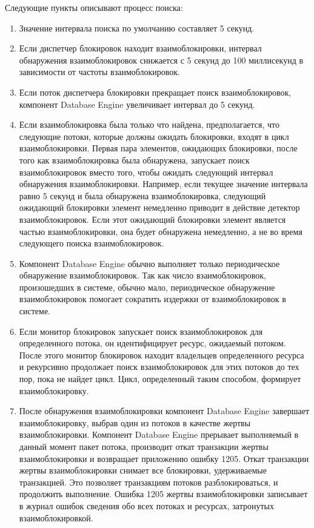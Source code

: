 Следующие пункты описывают процесс поиска:

\begin{enumerate}
	\item Значение интервала поиска по умолчанию составляет 5 секунд.
	\item Если диспетчер блокировок находит взаимоблокировки, интервал обнаружения взаимоблокировок снижается с 5 секунд до 100 миллисекунд в зависимости от частоты взаимоблокировок.
	
	\item Если поток диспетчера блокировки прекращает поиск взаимоблокировок, компонент Database Engine увеличивает интервал до 5 секунд.
	\item Если взаимоблокировка была только что найдена, предполагается, что следующие потоки, которые должны ожидать блокировки, входят в цикл взаимоблокировки. Первая пара элементов, ожидающих блокировки, после того как взаимоблокировка была обнаружена, запускает поиск
	взаимоблокировок вместо того, чтобы ожидать следующий интервал обнаружения взаимоблокировки. Например, если текущее значение интервала равно 5 секунд и была обнаружена взаимоблокировка, следующий ожидающий блокировки элемент немедленно приводит в действие детектор взаимоблокировок. Если этот ожидающий блокировки элемент является частью взаимоблокировки, она будет обнаружена немедленно, а не во время следующего поиска взаимоблокировок.
	\item Компонент Database Engine обычно выполняет только периодическое обнаружение взаимоблокировок. Так как число взаимоблокировок, произошедших в системе, обычно мало, периодическое обнаружение взаимоблокировок помогает сократить издержки от взаимоблокировок в системе.
	\item Если монитор блокировок запускает поиск взаимоблокировок для определенного потока, он идентифицирует ресурс, ожидаемый потоком. После этого монитор блокировок находит владельцев определенного ресурса и рекурсивно продолжает поиск взаимоблокировок для этих потоков до тех пор, пока не найдет цикл. Цикл, определенный таким способом, формирует взаимоблокировку. 
	\item После обнаружения взаимоблокировки компонент Database Engine завершает взаимоблокировку, выбрав один из потоков в качестве жертвы взаимоблокировки. Компонент Database Engine прерывает выполняемый в данный момент пакет потока, производит откат транзакции жертвы
	взаимоблокировки и возвращает приложению ошибку 1205. Откат транзакции жертвы взаимоблокировки снимает все блокировки, удерживаемые транзакцией. Это позволяет транзакциям потоков разблокироваться, и продолжить выполнение. Ошибка 1205 жертвы взаимоблокировки
	записывает в журнал ошибок сведения обо всех потоках и ресурсах, затронутых взаимоблокировкой.
\end{enumerate}

